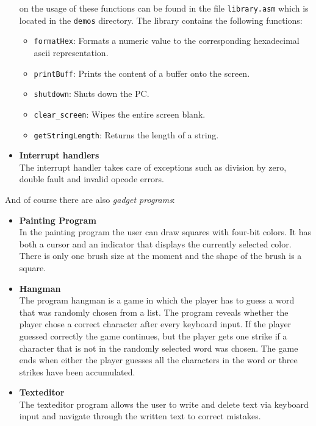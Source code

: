 \begin{itemize}
on the usage of these functions can be found in the file \texttt{library.asm} which is located
in the \texttt{demos} directory. The library contains the following functions: 
\begin{itemize}
\item \texttt{formatHex}: Formats a numeric value to the corresponding hexadecimal ascii representation.
\item \texttt{printBuff}: Prints the content of a buffer onto the screen. 
\item \texttt{shutdown}: Shuts down the PC. 
\item \texttt{clear\_screen}: Wipes the entire screen blank.
\item \texttt{getStringLength}: Returns the length of a string.
\end{itemize}

\item \textbf{Interrupt handlers} \\
The interrupt handler takes care of exceptions such as division by zero, double fault
and invalid opcode errors.


\end{itemize}

And of course there are also \textit{gadget programs}:

\begin{itemize}

\item \textbf{Painting Program} \\
In the painting program the user can draw squares with four-bit colors. It has both a cursor and an indicator 
that displays the currently selected color. There is only one brush size at the moment and the
shape of the brush is a square.

\item \textbf{Hangman} \\
The program hangman is a game in which the player has to guess a word that was randomly chosen from a list. The program 
reveals whether the player chose a correct character after every keyboard input. If the player guessed correctly
the game continues, but the player gets one strike if a character that is not in the randomly selected word 
was chosen. The game ends when either the player guesses all the characters in the word or three strikes have
been accumulated.

\item \textbf{Texteditor} \\
The texteditor program allows the user to write and delete text via keyboard input and navigate through the written 
text to correct mistakes.

\end{itemize}



